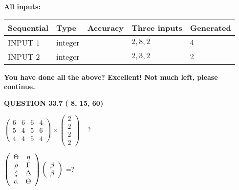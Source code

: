 \documentclass[12pt]{article}
\begin{document}
   
   
   
\noindent\vspace{0.1in}\hspace{-0.08in} {\textbf{\Large{All inputs: }}}
   
   
  
  
\noindent\begin{tabular}{|l|l|l|l|l|}
\hline
 Sequential & Type & Accuracy & Three inputs & Generated \\ 
\hline
 
 
  INPUT $           1$ & integer &  & $
 2
 , 
 8
 , 
 2
 $ & $ 4 $ 
 \\  \hline  
 
 
  INPUT $           2$ & integer &  & $
 2
 , 
 3
 , 
 2
 $ & $ 2 $ 
 \\  \hline  
 \end{tabular}
   
   
   
   
\vspace{0.3in}
{\textbf{\LARGE{You have done all the above? Excellent! Not much left, please continue.}}}
\vspace{0.3in}
   
   
  
\vspace{0.2in}
  
{\textbf{\Large{QUESTION
33.7 
 (          8,         15,         60)
}}}
  
  
 
$ \left( \begin{array}{ccccccccc}
           6 & 
           6 & 
           6 & 
           4 \\ 
           5 & 
           4 & 
           5 & 
           6 \\ 
           4 & 
           4 & 
           5 & 
           4
\end{array}\right) \times
\left( \begin{array}{c}
           2 \\ 
           2 \\ 
           2 \\ 
           2
\end{array}\right) $ =?
 
 
$  %
 \left( \begin{array}
 {
 c
 c
 }
 \Theta & 
 \eta \\ 
 \rho & 
 \Gamma \\ 
                    \zeta & 
 \Delta \\ 
 \alpha & 
 \Theta
 \end{array} \right)
 \left( \begin{array}
 {
 c
 }
 \beta \\ 
 \beta
 \end{array} \right)
$ =?
 
\end{document}

